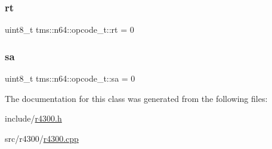 \mbox{\label{classtms_1_1n64_1_1opcode__t_a77740e73e4de347371f8b4770708c30f}} 
\subsubsection{\texorpdfstring{rt}{rt}}
{\footnotesize\ttfamily uint8\+\_\+t tms\+::n64\+::opcode\+\_\+t\+::rt = 0}

\mbox{\label{classtms_1_1n64_1_1opcode__t_a01e46aa71d06ff417bc3e3b8aafd9d1f}} 
\subsubsection{\texorpdfstring{sa}{sa}}
{\footnotesize\ttfamily uint8\+\_\+t tms\+::n64\+::opcode\+\_\+t\+::sa = 0}



The documentation for this class was generated from the following files\+:\begin{DoxyCompactItemize}
\item 
include/\hyperlink{r4300_8h}{r4300.\+h}\item 
src/r4300/\hyperlink{r4300_8cpp}{r4300.\+cpp}\end{DoxyCompactItemize}
